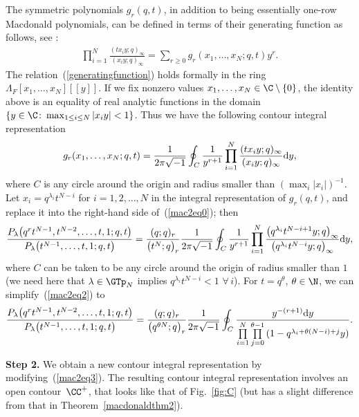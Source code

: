 The symmetric polynomials $g_r(q, t)$, in addition to being essentially one-row Macdonald polynomials, can be def\/ined in terms of their generating function as follows, see \cite[Chapter~VI]{M2}:
\begin{gather}\label{generatingfunction}
\prod_{i=1}^N{\frac{(tx_iy; q)_{\infty}}{(x_iy; q)_{\infty}}} = \sum_{r\geq 0}g_r(x_1, \dots, x_N; q, t)y^r.
\end{gather}
The relation~(\ref{generatingfunction}) holds formally in the ring $\Lambda_F[x_1, \dots, x_N][[y]]$. If we f\/ix nonzero values $x_1, \dots, x_N\in\C\setminus\{0\}$, the identity above is an equality of real analytic functions in the domain $\{y\in\C \colon \max_{1\leq i\leq N}{|x_i y|} < 1\}$. Thus we have the following contour integral representation
\begin{gather*}
g_r(x_1, \dots, x_N; q, t) = \frac{1}{2\pi\sqrt{-1}}\oint_C{\frac{1}{y^{r+1}}\prod_{i=1}^N{\frac{(tx_iy; q)_{\infty}}{(x_iy; q)_{\infty}}{\rm d}y}},
\end{gather*}
where $C$ is any circle around the origin and radius smaller than $(\max_i{|x_i|})^{-1}$. Let $x_i = q^{\lambda_i}t^{N-i}$ for $i = 1, 2, \dots, N$ in the integral representation of $g_r(q, t)$, and replace it into the right-hand side of~(\ref{mac2eq0}); then
\begin{gather}\label{mac2eq2}
\frac{P_{\lambda}\big(q^rt^{N-1}, t^{N-2}, \dots, t, 1; q, t\big)}{P_{\lambda}\big(t^{N-1}, \dots, t, 1; q, t\big)} = \frac{(q; q)_r}{\big(t^N; q\big)_r}\frac{1}{2\pi\sqrt{-1}}\oint_C{\frac{1}{y^{r+1}}\prod_{i=1}^N{\frac{\big(q^{\lambda_i}t^{N-i+1}y; q\big)_{\infty}}{\big(q^{\lambda_i}t^{N-i}y; q\big)_{\infty}}{\rm d}y}},
\end{gather}
where $C$ can be taken to be any circle around the origin of radius smaller than $1$ (we need here that $\lambda\in\GTp_N$ implies $q^{\lambda_i}t^{N-i} < 1$ $\forall\, i$). For $t = q^{\theta}$, $\theta\in\N$, we can simplify~(\ref{mac2eq2}) to
\begin{gather}\label{mac2eq3}
\frac{P_{\lambda}\big(q^rt^{N-1}, t^{N-2}, \dots, t, 1; q, t\big)}{P_{\lambda}\big(t^{N-1}, \dots, t, 1; q, t\big)} = \frac{(q; q)_r}{\big(q^{\theta N}; q\big)_r}\frac{1}{2\pi\sqrt{-1}}\oint_C
{\frac{y^{-(r+1)} {\rm d}y}{\prod\limits_{i=1}^N{\prod\limits_{j=0}^{\theta-1}{(1 - q^{\lambda_i + \theta(N - i) + j}y)}}}}.
\end{gather}

\textbf{Step 2.} We obtain a new contour integral representation by modifying~(\ref{mac2eq3}). The resulting contour integral representation involves an open contour~$\CC^+$, that looks like that of Fig.~\ref{fig:C} (but has a slight dif\/ference from that in Theorem~\ref{macdonaldthm2}).

